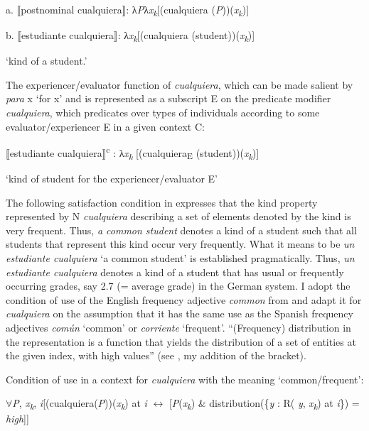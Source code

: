 \documentclass[output=paper]{langscibook}
\begin{document}
  a.  ⟦postnominal cualquiera⟧: λ\textit{P}λ\textit{x\textsubscript{k}}[(cualquiera (\textit{P}))(\textit{x\textsubscript{k}})]

  b.  ⟦estudiante cualquiera⟧: λ\textit{x\textsubscript{k}}[(cualquiera (student))(\textit{x\textsubscript{k}})]

    ‘kind of a student.’

The experiencer/evaluator function of \textit{cualquiera}, which can be made salient by \textit{para} x ‘for x’ and is represented as a subscript E on the predicate modifier \textit{cualquiera}, which predicates over types of individuals according to some evaluator/experiencer E in a given context C:

  ⟦estudiante cualquiera⟧\textsuperscript{c} : λ\textit{x\textsubscript{k} }[(cualquiera\textsubscript{E} (student))(\textit{x\textsubscript{k}})] 

  ‘kind of student for the experiencer/evaluator E’

The following satisfaction condition in  expresses that the kind property represented by N \textit{cualquiera} describing a set of elements denoted by the kind is very frequent. Thus, \textit{a common student} denotes a kind of a student such that all students that represent this kind occur very frequently. What it means to be \textit{un estudiante cualquiera} ‘a common student’ is established pragmatically. Thus, \textit{un estudiante cualquiera} denotes a kind of a student that has usual or frequently occurring grades, say 2.7 (= average grade) in the German system. I adopt the condition of use of the English frequency adjective \textit{common} from \citet{GehrkeMcNally2015} and adapt it for \textit{cualquiera} on the assumption that it has the same use as the Spanish frequency adjectives \textit{común} ‘common’ or \textit{corriente} ‘frequent’. “(Frequency) distribution in the representation is a function that yields the distribution of a set of entities at the given index, with high values” (see \citealt{GehrkeMcNally2015}, my addition of the bracket).

\label{bkm:Ref54641377}    Condition of use in a context for \textit{cualquiera} with the meaning ‘common/frequent’:

    ${\forall}$\textit{P}, \textit{x\textsubscript{k}}, \textit{i}[(cualquiera(\textit{P}))(\textit{x\textsubscript{k}}) at \textit{i} $\leftrightarrow $ [\textit{P}(\textit{x\textsubscript{k}}) \& distribution(\{\textit{y} : R( \textit{y}, \textit{x\textsubscript{k}}) at \textit{i}\}) = \textit{high}]]
\end{document}
